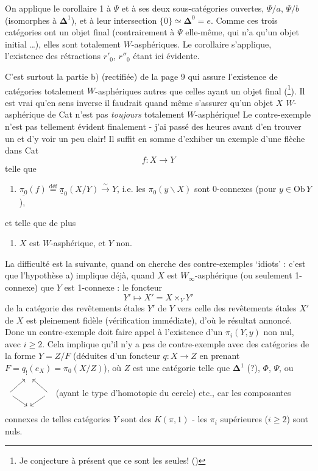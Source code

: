 \documentclass[11pt]{article}
\newcommand{\printedpage}[1]{\marginpar{\footnotesize p.~#1}}
\newcommand{\msp}[1]{\marginpar{\footnotesize [#1]}}
\newcommand{\Ob}{\mathrm{Ob}\,}
\newcommand{\upi}{\underline{\pi}}
\newcommand{\bDelta}{\boldsymbol{\Delta}}
\begin{document}
On applique le corollaire 1 à $\Psi$ et à ses deux sous-catégories ouvertes, $\Psi/a$, $\Psi/b$ (isomorphes à $\bDelta^1$), et à leur intersection $\{0\} \simeq \bDelta^0 = e$. Comme ces trois catégories ont un objet final (contrairement à $\Psi$ elle-même, qui n'a qu'un objet initial \dots), elles sont totalement $W$-asphériques. Le corollaire s'applique, l'existence des rétractions $r'_0$, $r''_0$ étant ici évidente.

C'est surtout la partie b) (rectifiée) de la page 9 qui assure l'existence de catégories totalement $W$-asphériques autres que celles ayant un objet final (\footnote{Je conjecture à présent que ce sont les seules! (\footnotemark)}). Il est vrai qu'en sens inverse il faudrait quand même s'assurer qu'un objet $X$ $W$-asphérique de Cat n'est pas \textit{toujours} totalement $W$-asphérique! Le contre-exemple n'est pas tellement évident finalement -
\msp{page 101}
j'ai passé des heures avant d'en trouver un et d'y voir un peu clair! Il suffit en somme d'exhiber un exemple d'une flèche dans Cat
\[
f : X \longrightarrow Y
\]
telle que
\printedpage{71}
\begin{enumerate}[label=\alph*)]
\item $\underline{\pi_0}(f) \overset{\text{déf}}{=} \upi_0(X/Y) \xrightarrow{\ \sim\ } Y$, i.e. les $\pi_0(y\backslash X)$ sont 0-connexes (pour $y \in \Ob Y$),
\end{enumerate}

et telle que de plus

\begin{enumerate}[label=\alph*), start=2]
\item $X$ est $W$-asphérique, et $Y$ non.
\end{enumerate}

La difficulté est la suivante, quand on cherche des contre-exemples `idiots' : c'est que l'hypothèse a) implique déjà, quand $X$ est $W_\infty$-asphérique (ou seulement 1-connexe) que $Y$ est 1-connexe : le foncteur
\[
Y' \longmapsto X' = X \times_Y Y'
\]
de la catégorie des revêtements étales $Y'$ de $Y$ vers celle des revêtements étales $X'$ de $X$ est pleinement fidèle (vérification immédiate), d'où le résultat annoncé. Donc un contre-exemple doit faire appel à l'existence d'un $\pi_i(Y,y)$ non nul, avec $i \geq 2$. Cela implique
\msp{page 102}
qu'il n'y a pas de contre-exemple avec des catégories de la forme $Y = Z/F$ (déduites d'un foncteur $q : X \longrightarrow Z$ en prenant $F = q_!(e_X) = \pi_0(X/Z)$), où $Z$ est une catégorie telle que $\bDelta^1$ (?), $\Phi$, $\Psi$, ou $\begin{tikzcd}[ampersand replacement=\&, sep=small, baseline=(M.base)]
 \& {} \& \\
{} \arrow[ur] \arrow[dr] \& |[alias=M]| \phantom{x} \& {} \arrow[ul] \arrow[dl] \\
 \& {} \&
\end{tikzcd}$ (ayant le type d'homotopie du cercle) etc., car les composantes connexes de telles catégories $Y$ sont des $K(\pi,1)$ - les $\pi_i$ supérieures ($i \geq 2$) sont nuls.
\end{document}
